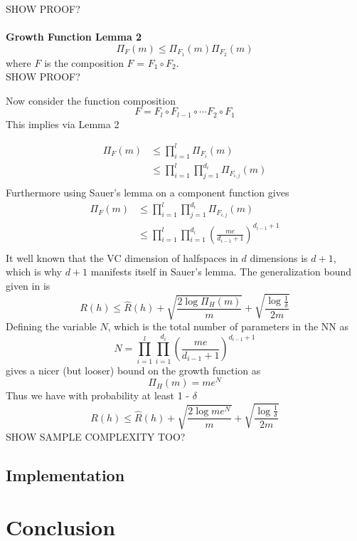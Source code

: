 \documentclass{article} %
\begin{document}
SHOW PROOF?
\\
\\
\textbf{Growth Function Lemma 2}
$$
\Pi_F(m) \leq \Pi_{F_1}(m)\Pi_{F_2}(m)
$$
where $F$ is the composition $F$ = $F_1 \circ F_2$.
\\

SHOW PROOF?


Now consider the function composition
$$
F = F_l \circ F_{l-1} \circ \cdots F_2 \circ F_1
$$
This implies via Lemma 2

\begin{align*}
\Pi_F(m) &\leq \prod_{i=1}^l \Pi_{F_i}(m)\\
& \leq \prod_{i=1}^l\prod_{j=1}^{d_i} \Pi_{F_{i,j}}(m)\\
\end{align*}
Furthermore using Sauer's lemma on a component function gives
\begin{align*}
\Pi_F(m)& \leq \prod_{i=1}^l\prod_{j=1}^{d_i} \Pi_{F_{i,j}}(m)\\
& \leq \prod_{i=1}^l\prod_{i=1}^{d_i}(\frac{me}{d_{i-1}+1})^{d_{i-1}+1}\\
\end{align*}
It well known that the VC dimension of halfspaces in $d$ dimensions is $d +1$, which is why $d+1$ manifests itself in Sauer's lemma.
The generalization bound given in \cite{mohri_foundations_2012} is 
$$
R(h) \leq \widehat{R}(h) + \sqrt{\frac{2\log{\Pi_H{(m)}}}{m}} + \sqrt{\frac{\log{\frac{1}{\delta}}}{2m}}
$$
Defining the variable $N$, which is the total number of parameters in the NN as 
$$
N = \prod_{i=1}^l\prod_{i=1}^{d_i}(\frac{me}{d_{i-1}+1})^{d_{i-1}+1}
$$ 
gives a nicer (but looser) bound on the growth function as
$$
\Pi_H{(m)} = me^N
$$
Thus we have with probability at least 1 - $\delta$
$$
R(h) \leq \widehat{R}(h) + \sqrt{\frac{2\log{me^N}}{m}} + \sqrt{\frac{\log{\frac{1}{\delta}}}{2m}}
$$
SHOW SAMPLE COMPLEXITY TOO?
\subsection{Implementation}

\section{Conclusion}



\nocite{yang_multiagent_2004}
\nocite{kim_autonomous_2003}
\nocite{mohri_foundations_2012}

\newpage
{}





\end{document}
